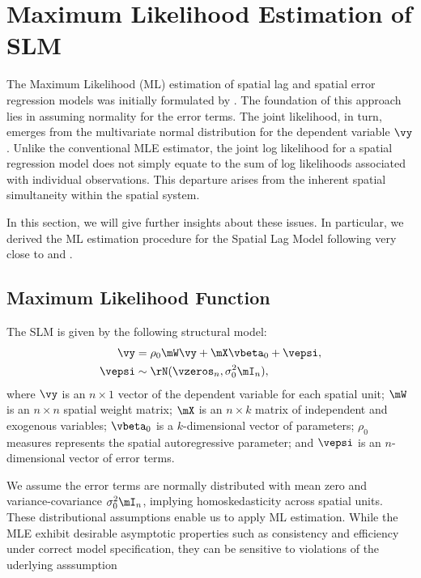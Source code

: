\documentclass[english,12pt]{book}\usepackage[]{graphicx}\usepackage[]{xcolor}
\begin{document}
\section{Maximum Likelihood Estimation of SLM}

The Maximum Likelihood (ML) estimation of spatial lag and spatial error regression models was initially formulated by \cite{ord1975estimation}. The foundation of this approach lies in assuming normality for the error terms. The joint likelihood, in turn, emerges from the multivariate normal distribution for the dependent variable $\vy$. Unlike the conventional MLE estimator, the joint log likelihood for a spatial regression model does not simply equate to the sum of log likelihoods associated with individual observations. This departure arises from the inherent spatial simultaneity within the spatial system.

In this section, we will give further insights about these issues. In particular, we derived the ML estimation procedure for the Spatial Lag Model following very close to \cite{ord1975estimation} and \citet[][chapter 6]{anselin1988spatial}.

\subsection{Maximum Likelihood Function}

The SLM is given by the following structural model:
\begin{equation}
  \begin{aligned}
    \vy     & = \rho_0 \mW\vy + \mX\vbeta_0 + \vepsi, \\
     \vepsi & \sim \rN(\vzeros_n , \sigma^2_0\mI_n),
  \end{aligned}
\end{equation}
%
where $\vy$ is an $n\times 1$ vector of the dependent variable for each spatial unit; $\mW$ is an $n\times n$ spatial weight matrix; $\mX$ is an $n \times k$ matrix of independent and exogenous variables; $\vbeta_0$ is a $k$-dimensional vector of parameters; $\rho_0$ measures represents the spatial autoregressive parameter; and $\vepsi$ is an $n$-dimensional vector of error terms. 

We assume the error terms are normally distributed with mean zero and variance-covariance $\sigma^2_0\mI_n$, implying homoskedasticity across spatial units. These distributional assumptions enable us to apply ML estimation. While the MLE exhibit desirable asymptotic properties such as consistency and efficiency under correct model specification, they can be sensitive to violations of the uderlying asssumption
\end{document}
